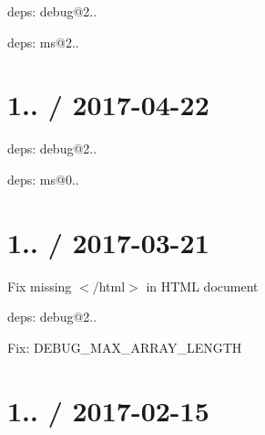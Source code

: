
\begin{DoxyItemize}
\item deps\+: debug@2..
\begin{DoxyItemize}
\item deps\+: ms@2..
\end{DoxyItemize}
\end{DoxyItemize}

\section*{1.. / 2017-\/04-\/22 }


\begin{DoxyItemize}
\item deps\+: debug@2..
\begin{DoxyItemize}
\item deps\+: ms@0..
\end{DoxyItemize}
\end{DoxyItemize}

\section*{1.. / 2017-\/03-\/21 }


\begin{DoxyItemize}
\item Fix missing {\ttfamily $<$/html$>$} in H\+T\+ML document
\item deps\+: debug@2..
\begin{DoxyItemize}
\item Fix\+: {\ttfamily D\+E\+B\+U\+G\+\_\+\+M\+A\+X\+\_\+\+A\+R\+R\+A\+Y\+\_\+\+L\+E\+N\+G\+TH}
\end{DoxyItemize}
\end{DoxyItemize}

\section*{1.. / 2017-\/02-\/15 }



